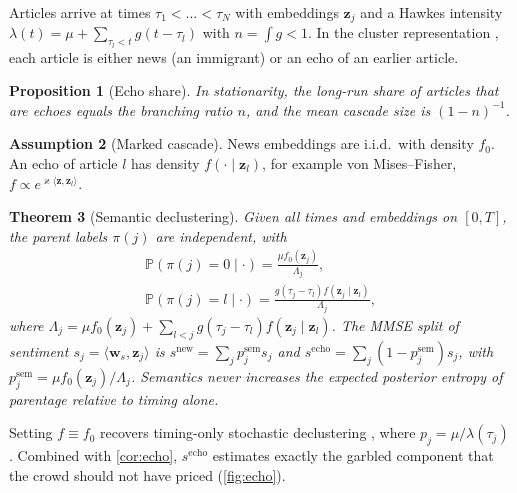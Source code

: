 \documentclass{article}
\theoremstyle{plain}
\newtheorem{theorem}{Theorem}[section]
\newtheorem{proposition}[theorem]{Proposition}
\theoremstyle{definition}
\newtheorem{assumption}[theorem]{Assumption}
\theoremstyle{remark}
\newcommand{\Prob}{\mathbb{P}}
\newcommand{\z}{\bm{z}}
\newcommand{\w}{\bm{w}}
\begin{document}
Articles arrive at times $\tau_1<\dots<\tau_N$ with embeddings $\z_j$ and a Hawkes intensity $\lambda(t)=\mu+\sum_{\tau_l<t}g(t-\tau_l)$ with $n=\int g<1$. In the cluster representation \citep{hawkesoakes1974}, each article is either news (an immigrant) or an echo of an earlier article.

\begin{proposition}[Echo share]\label{prop:branching}
In stationarity, the long-run share of articles that are echoes equals the branching ratio $n$, and the mean cascade size is $(1-n)^{-1}$.
\end{proposition}

\begin{assumption}[Marked cascade]\label{ass:marked}
News embeddings are i.i.d.\ with density $f_0$. An echo of article $l$ has density $f(\cdot\mid\z_l)$, for example von Mises--Fisher, $f\propto e^{\varkappa\langle\z,\z_l\rangle}$.
\end{assumption}

\begin{theorem}[Semantic declustering]\label{thm:semantic}
Given all times and embeddings on $[0,T]$, the parent labels $\pi(j)$ are independent, with
\begin{gather*}
  \Prob(\pi(j)=0\mid\cdot)=\frac{\mu f_0(\z_j)}{\Lambda_j},\\
  \Prob(\pi(j)=l\mid\cdot)=\frac{g(\tau_j-\tau_l)f(\z_j\mid\z_l)}{\Lambda_j},
\end{gather*}
where $\Lambda_j=\mu f_0(\z_j)+\sum_{l<j}g(\tau_j-\tau_l)f(\z_j\mid\z_l)$. The MMSE split of sentiment $s_j=\langle\w_s,\z_j\rangle$ is $s^{\mathrm{new}}=\sum_jp^{\mathrm{sem}}_js_j$ and $s^{\mathrm{echo}}=\sum_j(1-p^{\mathrm{sem}}_j)s_j$, with $p^{\mathrm{sem}}_j=\mu f_0(\z_j)/\Lambda_j$. Semantics never increases the expected posterior entropy of parentage relative to timing alone.
\end{theorem}

Setting $f\equiv f_0$ recovers timing-only stochastic declustering \citep{zhuang2002}, where $p_j=\mu/\lambda(\tau_j)$. Combined with \cref{cor:echo}, $s^{\mathrm{echo}}$ estimates exactly the garbled component that the crowd should not have priced (\cref{fig:echo}).
\end{document}
